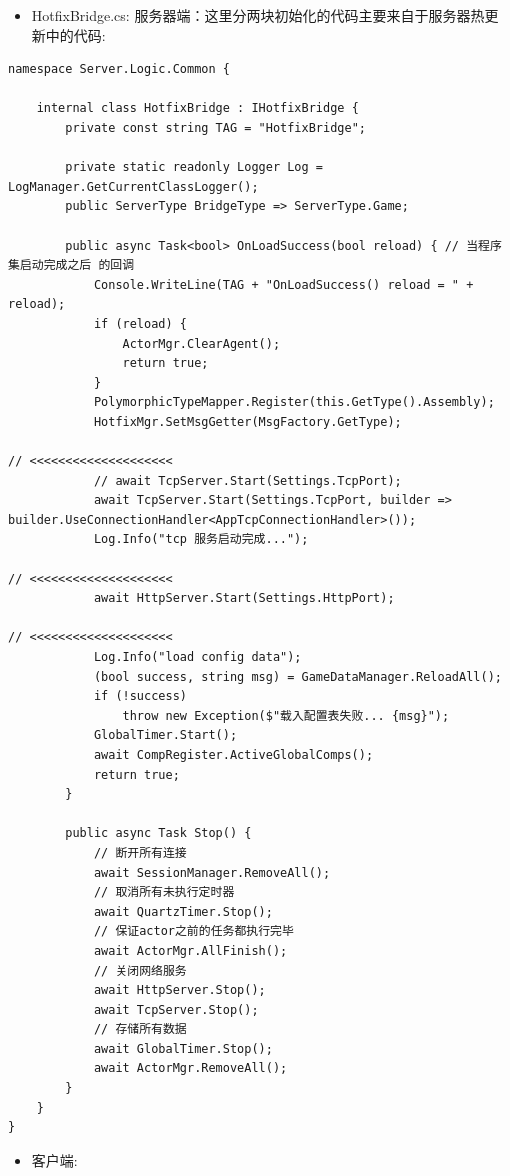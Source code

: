 \documentclass[9pt, b5paper]{article}
\begin{document}
\begin{itemize}
\item HotfixBridge.cs: 服务器端：这里分两块初始化的代码主要来自于服务器热更新中的代码:
\end{itemize}
\begin{verbatim}
namespace Server.Logic.Common {

    internal class HotfixBridge : IHotfixBridge {
        private const string TAG = "HotfixBridge";

        private static readonly Logger Log = LogManager.GetCurrentClassLogger();
        public ServerType BridgeType => ServerType.Game;

        public async Task<bool> OnLoadSuccess(bool reload) { // 当程序集启动完成之后 的回调
            Console.WriteLine(TAG + "OnLoadSuccess() reload = " + reload);
            if (reload) {
                ActorMgr.ClearAgent();
                return true;
            }
            PolymorphicTypeMapper.Register(this.GetType().Assembly);
            HotfixMgr.SetMsgGetter(MsgFactory.GetType);

// <<<<<<<<<<<<<<<<<<<< 
            // await TcpServer.Start(Settings.TcpPort);
            await TcpServer.Start(Settings.TcpPort, builder => builder.UseConnectionHandler<AppTcpConnectionHandler>());
            Log.Info("tcp 服务启动完成...");

// <<<<<<<<<<<<<<<<<<<< 
            await HttpServer.Start(Settings.HttpPort);

// <<<<<<<<<<<<<<<<<<<< 
            Log.Info("load config data");
            (bool success, string msg) = GameDataManager.ReloadAll();
            if (!success)
                throw new Exception($"载入配置表失败... {msg}");
            GlobalTimer.Start();
            await CompRegister.ActiveGlobalComps();
            return true;
        }

        public async Task Stop() {
            // 断开所有连接
            await SessionManager.RemoveAll();
            // 取消所有未执行定时器
            await QuartzTimer.Stop();
            // 保证actor之前的任务都执行完毕
            await ActorMgr.AllFinish();
            // 关闭网络服务
            await HttpServer.Stop();
            await TcpServer.Stop();
            // 存储所有数据
            await GlobalTimer.Stop();
            await ActorMgr.RemoveAll();
        }
    }
}
\end{verbatim}
\begin{itemize}
\item 客户端:
\end{itemize}
\end{document}
